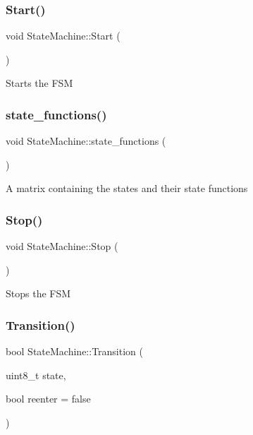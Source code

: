 \subsubsection{\texorpdfstring{Start()}{Start()}}
{\footnotesize\ttfamily void State\+Machine\+::\+Start (\begin{DoxyParamCaption}{ }\end{DoxyParamCaption})}

Starts the F\+SM \hypertarget{class_state_machine_acc87359cd98c436f5b891ffe6cb67160}{}\label{class_state_machine_acc87359cd98c436f5b891ffe6cb67160} 
\subsubsection{\texorpdfstring{state\+\_\+functions()}{state\_functions()}}
{\footnotesize\ttfamily void State\+Machine\+::state\+\_\+functions (\begin{DoxyParamCaption}{ }\end{DoxyParamCaption})\hspace{0.3cm}{\ttfamily [private]}}

A matrix containing the states and their state functions \hypertarget{class_state_machine_a2eb142249e4c483c8a329b1a18b4383f}{}\label{class_state_machine_a2eb142249e4c483c8a329b1a18b4383f} 
\subsubsection{\texorpdfstring{Stop()}{Stop()}}
{\footnotesize\ttfamily void State\+Machine\+::\+Stop (\begin{DoxyParamCaption}{ }\end{DoxyParamCaption})}

Stops the F\+SM \hypertarget{class_state_machine_a1597799edc5a89006f164e52fd72d02b}{}\label{class_state_machine_a1597799edc5a89006f164e52fd72d02b} 
\subsubsection{\texorpdfstring{Transition()}{Transition()}}
{\footnotesize\ttfamily bool State\+Machine\+::\+Transition (\begin{DoxyParamCaption}\item[{uint8\+\_\+t}]{state,  }\item[{bool}]{reenter = {\ttfamily false} }\end{DoxyParamCaption})}

